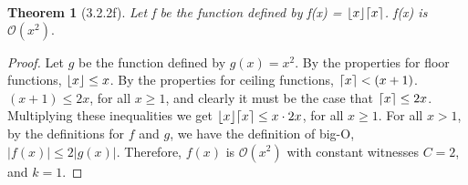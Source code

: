 \documentclass[a4paper, 12pt]{article}
\theoremstyle{plain}
\newtheorem*{theorem*}{Theorem}
\DeclarePairedDelimiter{\floor}{\lfloor}{\rfloor}
\DeclarePairedDelimiter{\ceil}{\lceil}{\rceil}
\begin{document}
	
	\begin{theorem*}[3.2.2f]
		Let f be the function defined by f(x) = $\floor{x} \ceil{x}$. \newline f(x) is $\mathcal{O}(x^{2}).$
	\end{theorem*}
	
	\begin{proof}
		Let $g$ be the function defined by $g(x) = x^{2}$. By the properties for floor functions, $\floor{x} \le x$. By the properties for ceiling functions, $\ceil{x} < (x+1)$. $(x+1) \le 2x$, for all $x \ge 1$, and clearly it must be the case that $\ceil{x} \le 2x$. Multiplying these inequalities we get $\floor{x} \ceil{x} \le x \cdot 2x$, for all $x \ge 1$. For all $x > 1$, by the definitions for $f$ and $g$, we have the definition of big-O, $|f(x)| \le 2|g(x)|$. Therefore, $f(x)$ is $\mathcal{O}(x^{2})$ with constant witnesses $C = 2$, and $k = 1$.
	\end{proof}
\end{document}
